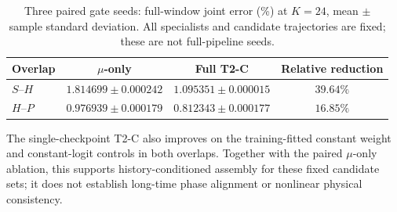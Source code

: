 \begin{table}[H]
\centering
\caption{Three paired gate seeds: full-window joint error (\%) at
$K=24$, mean $\pm$ sample standard deviation. All specialists and
candidate trajectories are fixed; these are not full-pipeline seeds.}
\label{tab:t2c_window_seeds}
\small
\begin{tabular}{@{}lccc@{}}
\toprule
Overlap & $\mu$-only & Full T2-C & Relative reduction\\
\midrule
$S$--$H$ & $1.814699\pm0.000242$ & $1.095351\pm0.000015$ & $39.64\%$\\
$H$--$P$ & $0.976939\pm0.000179$ & $0.812343\pm0.000177$ & $16.85\%$\\
\bottomrule
\end{tabular}
\end{table}

The single-checkpoint T2-C also improves on the training-fitted constant
weight and constant-logit controls in both overlaps. Together with the
paired $\mu$-only ablation, this supports history-conditioned assembly
for these fixed candidate sets; it does not establish long-time phase
alignment or nonlinear physical consistency.
